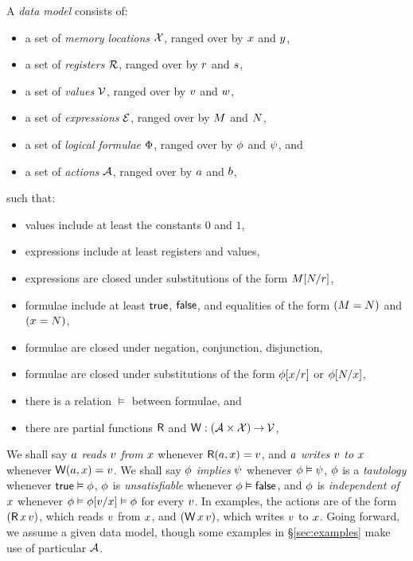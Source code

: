 A \emph{data model} consists of:
\begin{itemize}
\item a set of \emph{memory locations} $\mathcal{X}$, ranged over by
  $x$ and $y$,
\item a set of \emph{registers} $\mathcal{R}$, ranged over by
  $r$ and $s$,
\item a set of \emph{values} $\mathcal{V}$, ranged over by
  $v$ and $w$,
\item a set of \emph{expressions} $\mathcal{E}$, ranged over by
  $M$ and $N$,
\item a set of \emph{logical formulae} $\Phi$, ranged over by
  $\phi$ and $\psi$, and
\item a set of \emph{actions} $\mathcal{A}$, ranged over by $a$ and $b$,
\end{itemize}
such that:
\begin{itemize}
\item values include at least the constants $0$ and $1$,
\item expressions include at least registers and values,
\item expressions are closed under substitutions of the form $M[N/r]$,
\item formulae include at least $\mathsf{true}$, $\mathsf{false}$, and equalities of the form $(M=N)$ and $(x=N)$,
\item formulae are closed under negation, conjunction, disjunction,
\item formulae are closed under substitutions of the form $\phi[x/r]$ or $\phi[N/x]$,
\item there is a relation $\vDash$ between formulae, and
\item there are partial functions $\mathsf{R}$ and $\mathsf{W}: (\mathcal{A} \times \mathcal{X}) \mathbin\rightarrow \mathcal{V}$,
\end{itemize}
We shall say $a$ \emph{reads} $v$ \emph{from} $x$ whenever
$\mathsf{R}(a,x) = v$, and
$a$ \emph{writes} $v$ \emph{to} $x$ whenever
$\mathsf{W}(a,x) = v$.
We shall say $\phi$ \emph{implies} $\psi$ whenever $\phi\vDash\psi$,
$\phi$ is a \emph{tautology} whenever $\mathsf{true}\vDash\phi$,
$\phi$ is \emph{unsatisfiable} whenever $\phi\vDash\mathsf{false}$, and
$\phi$ is \emph{independent of $x$} whenever $\phi \vDash \phi[v/x] \vDash \phi$ for every $v$.
In examples, the actions are of the form $(\DR{\aLoc}{\aVal})$, which reads $v$ from $x$,
and $(\DW{\aLoc}{\aVal})$, which writes $v$ to $x$.
Going forward, we assume a given data model, though some examples in
\S\ref{sec:examples} make use of particular $\mathcal{A}$.

